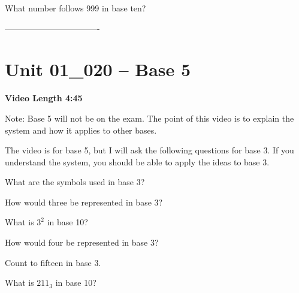 \documentclass[letterpaper,12pt]{exam}
\newcommand{\unit}{Unit 01}
\begin{document}
\begin{questions}
\begin{samepage}
    \question What number follows 999 in base ten?
    \vspace{5mm}
\end{samepage}
\par
 
----------------------------------

\section*{\unit\_020 -- Base 5}
\par{\selectfont\textbf{Video Length 4:45}}

Note:  Base 5 will not be on the exam.  The point of this video is to explain the system and how it applies to other bases.

The video is for base 5, but I will ask the following questions for base 3.  If you understand the system, you should be able to apply the ideas to base 3.

\begin{samepage}
    \question What are the symbols used in base 3?
    \vspace{5mm}
\end{samepage}
\begin{samepage}
    \question How would three be represented in base 3?
    \vspace{5mm}
\end{samepage}


\begin{samepage}
    \question What is $3^2$ in base 10?
    \vspace{5mm}
\end{samepage}
\par

\begin{samepage}
    \question How would four be represented in base 3?
    \vspace{5mm}
\end{samepage}

\begin{samepage}
    \question Count to fifteen in base 3.
    \vspace{25mm}
\end{samepage}
\par
 
\begin{samepage}
    \question What is $211_3$ in base 10?
    \vspace{5mm}
\end{samepage}
\par


\end{questions}
\end{document}
